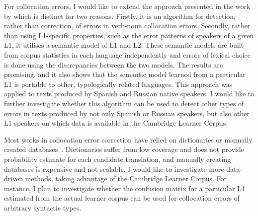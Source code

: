 \documentclass[11pt]{article}
\begin{document}
For collocation errors, I would like to extend the approach presented in the work by \cite{kochmarcross} which is distinct for two reasons. Firstly, it is an algorithm for detection, rather than correction, of errors in verb-noun collocation errors. Secondly, rather than using L1-specific properties, such as the error patterns of speakers of a given L1, it utilises a semantic model of L1 and L2. These semantic models are built from corpus statistics in each language independently and errors of lexical choice is done using the discrepancies between the two models. The results are promising, and it also shows that the semantic model learned from a particular L1 is portable to other, typologically related languages. This approach was applied to texts produced by Spanish and Russian native speakers. I would like to further investigate whether this algorithm can be used to detect other types of errors in texts produced by not only Spanish or Russian speakers, but also other L1 speakers on which data is available in the Cambridge Learner Corpus.
					
Most works in collocation error correction have relied on dictionaries or manually created databases~\citep{shei2000esl, wible2003bootstrapping, futagi2008computational}. Dictionaries suffer from low coverage and does not provide probability estimate for each candidate translation, and manually creating databases is expensive and not scalable. I would like to investigate more data-driven methods, taking advantage of the Cambridge Learner Corpus. For instance, I plan to investigate whether the confusion matrix for a particular L1 estimated from the actual learner corpus can be used for collocation errors of arbitrary syntactic types.
\end{document}
